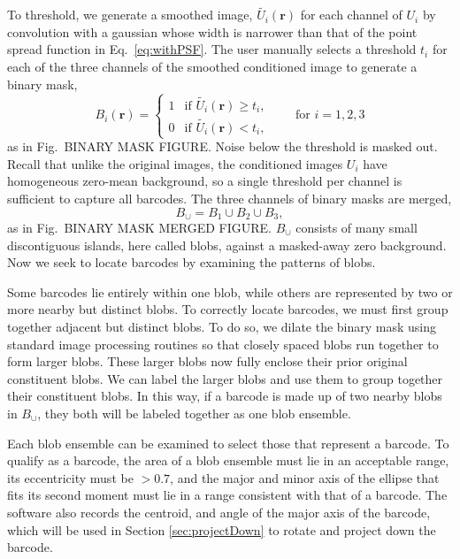  To threshold, we generate a smoothed image, $\tilde{U_i}(\mathbf{r})$ for each channel of $U_i$ by  convolution with a gaussian whose width is narrower than that of the point spread function in Eq.~\ref{eq:withPSF}. The user manually selects a threshold $t_i$ for each of the three channels of the smoothed conditioned image to generate a binary mask,
\begin{equation}
	B_i(\mathbf{r}) = \left\{
	\begin{array}{rl}
		 1 & \text{if } \tilde{U_i}(\mathbf{r}) \geq t_i,\\
		 0 & \text{if } \tilde{U_i}(\mathbf{r}) < t_i,
	\end{array} \right. \qquad\text{for } i=1,2,3
\end{equation}
as in Fig.~BINARY MASK FIGURE. Noise below the threshold is masked out. Recall that unlike the original images, the conditioned images $U_i$ have homogeneous zero-mean  background, so a single threshold per channel is sufficient to capture all barcodes. The three channels of binary masks are merged, 
\begin{equation}
B_{\cup}=B_1\cup B_2 \cup B_3, 
\end{equation}
as in Fig.~BINARY MASK MERGED FIGURE. $B_\cup$ consists of many small discontiguous islands, here called blobs, against a masked-away zero background.  Now we seek to locate barcodes by examining the patterns of blobs.

Some barcodes lie entirely within one blob, while others are represented by two or more nearby but distinct blobs. To correctly locate barcodes, we must first  group together adjacent but distinct blobs.  To do so, we dilate the binary mask using standard image processing routines so that closely spaced blobs run together to form larger blobs. These larger blobs now fully enclose their prior original constituent blobs. We can label the larger blobs and use them to group together their constituent blobs. In this way, if a barcode is made up of two nearby blobs in $B_\cup$, they both will be labeled together as one blob ensemble.

Each blob ensemble can be examined to select those that represent a barcode. To qualify as a barcode, the area of a blob ensemble must lie in an acceptable range, its  eccentricity must be  $>0.7$,  and the major and minor axis of the ellipse that fits its second moment must lie in a range consistent with that of a barcode. The software also records the centroid, and angle of the major axis of the barcode, which will be used in Section \ref{sec:projectDown} to rotate and project down the barcode. 

